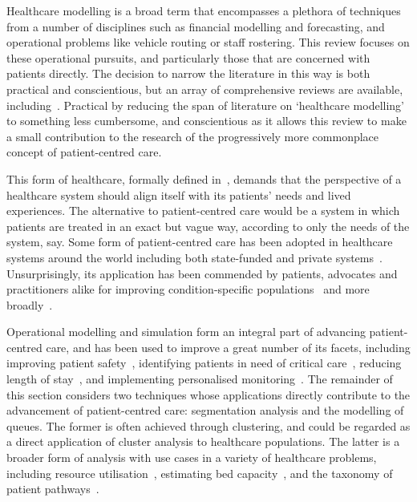 Healthcare modelling is a broad term that encompasses a plethora of techniques
from a number of disciplines such as financial modelling and forecasting, and
operational problems like vehicle routing or staff rostering. This review
focuses on these operational pursuits, and particularly those that are concerned
with patients directly. The decision to narrow the literature in this way is
both practical and conscientious, but an array of comprehensive reviews are
available, including~\cite{Brailsford2016,Galetsi2020,Kunc2018,Palmer2018}.
Practical by reducing the span of literature on `healthcare modelling' to
something less cumbersome, and conscientious as it allows this review to make a
small contribution to the research of the progressively more commonplace concept
of patient-centred care.

This form of healthcare, formally defined in~\cite{Robinson2008}, demands that
the perspective of a healthcare system should align itself with its patients'
needs and lived experiences. The alternative to patient-centred care would be a
system in which patients are treated in an exact but vague way, according to
only the needs of the system, say. Some form of patient-centred care has been
adopted in healthcare systems around the world including both state-funded and
private systems~\cite{DoH2010,Dewi2013,Luxford2011}. Unsurprisingly, its
application has been commended by patients, advocates and practitioners alike
for improving condition-specific
populations~\cite{Foster2019,Gambling2010,Gondek2016,Tsianakas2012} and more
broadly~\cite{IAPO2012,Richards2015,Santana2019}.

Operational modelling and simulation form an integral part of advancing
patient-centred care, and has been used to improve a great number of its facets,
including improving patient safety~\cite{Jun2010}, identifying patients in need
of critical care~\cite{Adeyemi2013}, reducing length of stay~\cite{Gul2012}, and
implementing personalised monitoring~\cite{Velikova2014}. The remainder of this
section considers two techniques whose applications directly contribute to the
advancement of patient-centred care: segmentation analysis and the modelling of
queues. The former is often achieved through clustering, and could be regarded
as a direct application of cluster analysis to healthcare populations. The
latter is a broader form of analysis with use cases in a variety of healthcare
problems, including resource utilisation~\cite{Prokofyeva2020}, estimating bed
capacity~\cite{Williams2015}, and the taxonomy of patient
pathways~\cite{Rojas2016}.


